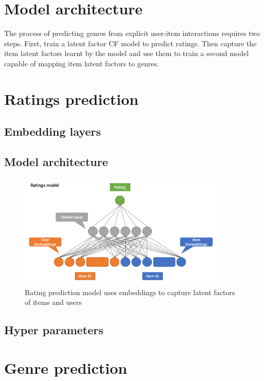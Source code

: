 \section{Model architecture}
The process of predicting genres from explicit user-item interactions requires two steps. First, train a latent factor CF model to predict ratings. Then capture the item latent factors learnt by the model and use them to train a second model capable of mapping item latent factors to genres.

\section{Ratings prediction}

\subsection{Embedding layers}

\subsection{Model architecture}
\begin{figure}[H]
\centering
\includegraphics[width=0.9\textwidth]{Figures/3_ratings-model.png}
\decoRule
\caption[Ratings prediction model]{Rating prediction model uses embeddings to capture latent factors of items and users}
\label{fig:3_rating-prediction-architecture}
\end{figure}

\subsection{Hyper parameters}

\section{Genre prediction}


